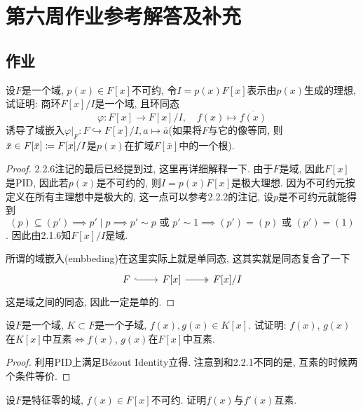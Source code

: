 \documentclass{../solutions-cn}
\begin{document}
\section*{第六周作业参考解答及补充}

\subsection*{作业}

\begin{exercise}[习题2.3.2]
    设$F$是一个域, $p(x) \in F[x]$不可约, 令$I = p(x)F[x]$表示由$p(x)$生成的理想, 试证明: 商环$F[x]/I$是一个域, 且环同态
    \[
        \varphi:F[x] \to F[x]/I,\quad f(x) \mapsto \overline{f(x)}
    \]
    诱导了域嵌入$\varphi|_F: F \hookrightarrow F[x]/I, a \mapsto \bar{a}$(如果将$F$与它的像等同, 则$\bar{x} \in F[\bar{x}] \mathrel{\coloneqq} F[x]/I$是$p(x)$在扩域$F[\bar{x}]$中的一个根).
\end{exercise}

\begin{proof}
    2.2.6注记的最后已经提到过, 这里再详细解释一下. 由于$F$是域, 因此$F[x]$是PID, 因此若$p(x)$是不可约的, 则$I = p(x)F[x]$是极大理想. 因为不可约元按定义在所有主理想中是极大的, 这一点可以参考2.2.2的注记, 设$p$是不可约元就能得到
    \[
        (p) \subseteq (p') \implies p' \mid p \implies p' \sim p \text{ 或 } p' \sim 1 \implies (p') = (p) \text{ 或 } (p') = (1)
    \]. 因此由2.1.6知$F[x]/I$是域.
    
    所谓的域嵌入(embbeding)在这里实际上就是单同态, 这其实就是同态复合了一下
    \[
        \begin{tikzcd}
            F \arrow[r, hook] & {F[x]} \arrow[r, two heads] & {F[x]/I}
        \end{tikzcd}
    \]
    这是域之间的同态, 因此一定是单的.
\end{proof}

\begin{exercise}[习题2.3.3]
    设$F$是一个域, $K \subset F$是一个子域, $f(x), g(x) \in K[x]$. 试证明: $f(x)$, $g(x)$在$K[x]$中互素$\Leftrightarrow f(x)$, $g(x)$在$F[x]$中互素.
\end{exercise}

\begin{proof}
    利用PID上满足Bézout Identity立得. 注意到和2.2.1不同的是, 互素的时候两个条件等价.
\end{proof}

\begin{exercise}[习题2.3.4]
    设$F$是特征零的域, $f(x) \in F[x]$不可约. 证明$f(x)$与$f'(x)$互素.
\end{exercise}
\end{document}
